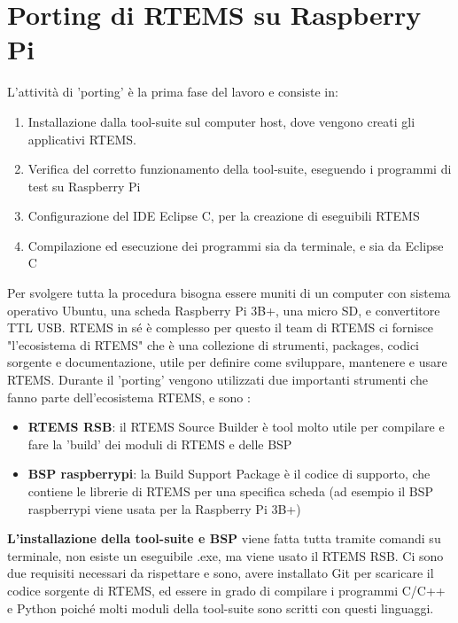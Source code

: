 \documentclass[12pt, a4paper, titlepage, oneside]{book}
\begin{document}
\chapter{Porting di RTEMS su Raspberry Pi }
L'attività di 'porting' è la prima fase del lavoro e consiste in:
\begin{enumerate}
    \item Installazione dalla tool-suite sul computer host, dove vengono creati gli applicativi RTEMS.
    \item Verifica del corretto funzionamento della tool-suite, eseguendo i programmi di test su Raspberry Pi
    \item Configurazione del IDE Eclipse C, per la creazione di eseguibili RTEMS
    \item Compilazione ed esecuzione dei programmi sia da terminale, e sia da Eclipse C
\end{enumerate}
Per svolgere tutta la procedura bisogna essere muniti di un computer con sistema operativo Ubuntu, una scheda Raspberry Pi 3B+, una micro SD, e convertitore TTL USB.\newline
RTEMS in sé è complesso per questo il team di RTEMS ci fornisce "l'ecosistema di RTEMS" che è una collezione di strumenti, packages, codici sorgente e documentazione, utile per definire come sviluppare, mantenere e usare RTEMS.\newline
Durante il 'porting' vengono utilizzati due importanti strumenti che fanno parte dell'ecosistema RTEMS, e sono :
\begin{itemize}
    \item\parbox[t]{\linewidth}{\textbf{RTEMS RSB}: il RTEMS Source Builder è tool molto utile per compilare e fare la 'build' dei moduli di RTEMS e delle BSP}
    \item\parbox[t]{\linewidth}{\textbf{BSP raspberrypi}: la Build Support Package è il codice di supporto, che contiene le librerie di RTEMS per una specifica scheda (ad esempio il BSP raspberrypi viene usata per la Raspberry Pi 3B+)}
\end{itemize}
\textbf{L'installazione della tool-suite e BSP }viene fatta tutta tramite comandi su terminale, non esiste un eseguibile .exe, ma viene usato il RTEMS RSB.\newline
Ci sono due requisiti necessari da rispettare e sono, avere installato Git per scaricare il codice sorgente di RTEMS, ed essere in grado di compilare i programmi C/C++ e Python poiché molti moduli della tool-suite sono scritti con questi linguaggi.\newline
\end{document}
